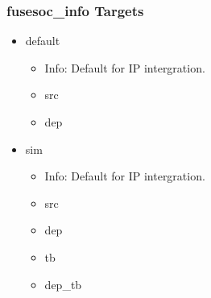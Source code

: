 \subsubsection{fusesoc\_info Targets}
\begin{itemize}
\item default
	\begin{itemize}
	\item[$\space$] Info: Default for IP intergration.
	\item src
	\item dep
	\end{itemize}
\item sim
	\begin{itemize}
	\item[$\space$] Info: Default for IP intergration.
	\item src
	\item dep
	\item tb
	\item dep\_tb
	\end{itemize}
\end{itemize}
